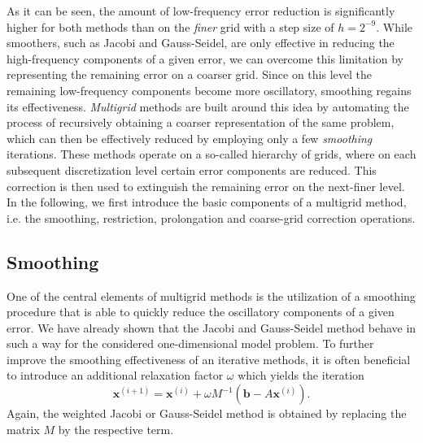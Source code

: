 As it can be seen, the amount of low-frequency error reduction is significantly higher for both methods than on the \emph{finer} grid with a step size of $h = 2^{-9}$.
While smoothers, such as Jacobi and Gauss-Seidel, are only effective in reducing the high-frequency components of a given error, we can overcome this limitation by representing the remaining error on a coarser grid.
Since on this level the remaining low-frequency components become more oscillatory, smoothing regains its effectiveness. 
\emph{Multigrid} methods are built around this idea by automating the process of recursively obtaining a coarser representation of the same problem, which can then be effectively reduced by employing only a few \emph{smoothing} iterations.
These methods operate on a so-called hierarchy of grids, where on each subsequent discretization level certain error components are reduced.
This correction is then used to extinguish the remaining error on the next-finer level.
In the following, we first introduce the basic components of a multigrid method, i.e. the smoothing, restriction, prolongation and coarse-grid correction operations.
\subsection{Smoothing}
\label{subsec:smoothing}
One of the central elements of multigrid methods is the utilization of a smoothing procedure that is able to quickly reduce the oscillatory components of a given error.
We have already shown that the Jacobi and Gauss-Seidel method behave in such a way for the considered one-dimensional model problem.
To further improve the smoothing effectiveness of an iterative methods, it is often beneficial to introduce an additional relaxation factor $\omega$ which yields the iteration 
\begin{equation}
	\bm{x}^{(i+1)} = \bm{x}^{(i)} + \omega M^{-1}(\bm b - A \bm{x}^{(i)}).
	\label{eq:general-weighted-stationary-iterative-method}
\end{equation}
Again, the weighted Jacobi or Gauss-Seidel method is obtained by replacing the matrix $M$ by the respective term.
